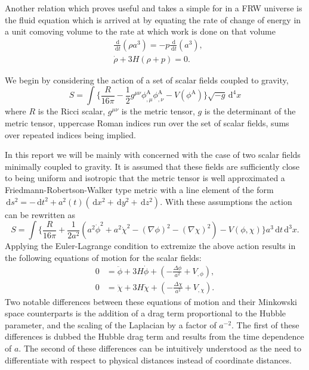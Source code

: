 \documentclass[letterpaper,11pt]{article}
\newcommand{\ud}{\,\mathrm{d}}
\begin{document}
Another relation which proves useful and takes a simple for in a FRW universe is the fluid equation which is arrived at by equating the rate of change of energy in a unit comoving volume to the rate at which work is done on that volume
\begin{align}
&\frac{\ud}{\ud t}(\rho a^3)=-p\frac{\ud}{\ud t}(a^3),\\
&\dot{\rho}+3H(\rho +p)=0. \label{fluid eqn}
\end{align}




We begin by considering the action of a set of scalar fields coupled to gravity,
\begin{equation}
S=\int \Big\{ \frac{R}{16\pi} - \frac{1}{2}g^{\mu \nu} \phi_{,\mu}^{\mathrm{A}} \phi_{,\nu}^{\mathrm{A}}-V(\phi^{\mathrm{A}}) \Big\} \sqrt{-g}\ud^4x
\end{equation}
where $R$ is the Ricci scalar, $g^{\mu \nu}$ is the metric tensor, $g$ is the determinant of the metric tensor, uppercase Roman indices run over the set of scalar fields, sums over repeated indices being implied. %

In this report we will be mainly with concerned with the case of two scalar fields minimally coupled to gravity. It is assumed that these fields are sufficiently close to being uniform and isotropic that the metric tensor is well approximated a Friedmann-Robertson-Walker type metric with a line element of the form $\ud s^2=-\ud t^2+a^2(t)(\ud x^2+\ud y^2+\ud z^2)$. With these assumptions the action can be rewritten as
\begin{equation}
S=\int \Big\{ \frac{R}{16 \pi}+\frac{1}{2a^2}(a^2 \dot{\phi}^2+a^2\dot{\chi}^2-(\nabla{\phi})^2-(\nabla{\chi})^2)-V(\phi,\chi) \Big\}a^3\ud t\ud^3x.
\end{equation}
Applying the Euler-Lagrange condition to extremize the above action results in the following equations of motion for the scalar fields:
\begin{align}
0&=\ddot{\phi}+3H\dot{\phi}+(-\frac{\Delta \phi}{a^2}+V_{,\phi}),\\
0&=\ddot{\chi}+3H\dot{\chi}+(-\frac{\Delta \chi}{a^2}+V_{,\chi}).
\end{align}
Two notable differences between these equations of motion and their Minkowski space counterparts is the addition of a drag term proportional to the Hubble parameter, and the scaling of the Laplacian by a factor of $a^{-2}$. The first of these differences is dubbed the Hubble drag term and results from the time dependence of $a$. The second of these differences can be intuitively understood as the need to differentiate with respect to physical distances instead of coordinate distances.
\end{document}
